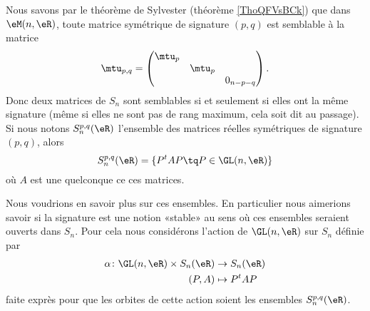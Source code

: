 Nous savons par le théorème de Sylvester (théorème \ref{ThoQFVsBCk}) que dans \( \eM(n,\eR)\), toute matrice symétrique de signature \( (p,q)\) est semblable à la matrice
\begin{equation}
    \mtu_{p,q}=\begin{pmatrix}
        \mtu_p    &       &       \\
        &   \mtu_{p}    &       \\
        &       &   0_{n-p-q}
    \end{pmatrix}.
\end{equation}
Donc deux matrices de \( S_n\) sont semblables si et seulement si elles ont la même signature (même si elles ne sont pas de rang maximum, cela soit dit au passage). Si nous notons \( S_n^{p,q}(\eR)\) l'ensemble des matrices réelles symétriques de signature \( (p,q)\), alors
\begin{equation}
    S_n^{p,q}(\eR)=\{ P^tAP\tq P\in \GL(n,\eR) \}
\end{equation}
où \( A\) est une quelconque ce ces matrices.

Nous voudrions en savoir plus sur ces ensembles. En particulier nous aimerions savoir si la signature est une notion «stable» au sens où ces ensembles seraient ouverts dans \( S_n\). Pour cela nous considérons l'action de \( \GL(n,\eR)\) sur \( S_n\) définie par
\begin{equation}
    \begin{aligned}
        \alpha\colon \GL(n,\eR)\times S_n(\eR)&\to S_n(\eR) \\
        (P,A)&\mapsto P^tAP 
    \end{aligned}
\end{equation}
faite exprès pour que les orbites de cette action soient les ensembles \( S_n^{p,q}(\eR)\).

